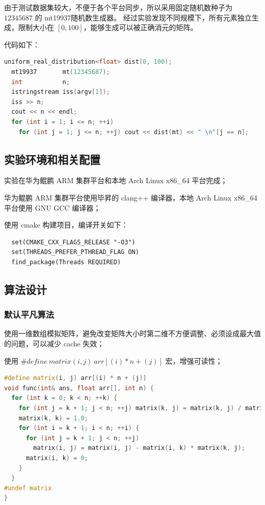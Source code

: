 \documentclass[a4paper]{article}
\begin{document}
由于测试数据集较大，不便于各个平台同步，所以采用固定随机数种子为 $12345687$ 的 mt19937随机数生成器。
经过实验发现不同规模下，所有元素独立生成，限制大小在 $[0, 100]$，能够生成可以被正确消元的矩阵。

代码如下：

\begin{lstlisting}[title=测试数据集生成器,frame=trbl,language={C++}]
  uniform_real_distribution<float> dist(0, 100);
  mt19937       mt(12345687);
  int           n;
  istringstream iss(argv[1]);
  iss >> n;
  cout << n << endl;
  for (int i = 1; i <= n; ++i)
    for (int j = 1; j <= n; ++j) cout << dist(mt) << " \n"[j == n];
\end{lstlisting}

\subsection{实验环境和相关配置}

实验在华为鲲鹏 ARM 集群平台和本地 Arch Linux x86\_64 平台完成；

华为鲲鹏 ARM 集群平台使用毕昇的 clang++ 编译器，本地 Arch Linux x86\_64 平台使用 GNU GCC 编译器；

使用 cmake 构建项目，编译开关如下：

\begin{verbatim}
  set(CMAKE_CXX_FLAGS_RELEASE "-O3")
  set(THREADS_PREFER_PTHREAD_FLAG ON)
  find_package(Threads REQUIRED)
\end{verbatim}

\subsection{算法设计}

\subsubsection{默认平凡算法}

使用一维数组模拟矩阵，避免改变矩阵大小时第二维不方便调整、必须设成最大值的问题，可以减少 cache 失效；

使用 $\#define\ matrix(i, j)\ arr[(i) * n + (j)]$ 宏，增强可读性；

\begin{lstlisting}[title=平凡算法,frame=trbl,language={C++}]
#define matrix(i, j) arr[(i) * n + (j)]
void func(int& ans, float arr[], int n) {
  for (int k = 0; k < n; ++k) {
    for (int j = k + 1; j < n; ++j) matrix(k, j) = matrix(k, j) / matrix(k, k);
    matrix(k, k) = 1.0;
    for (int i = k + 1; i < n; ++i) {
      for (int j = k + 1; j < n; ++j)
        matrix(i, j) = matrix(i, j) - matrix(i, k) * matrix(k, j);
      matrix(i, k) = 0;
    }
  }
#undef matrix
}
\end{lstlisting}
\end{document}
